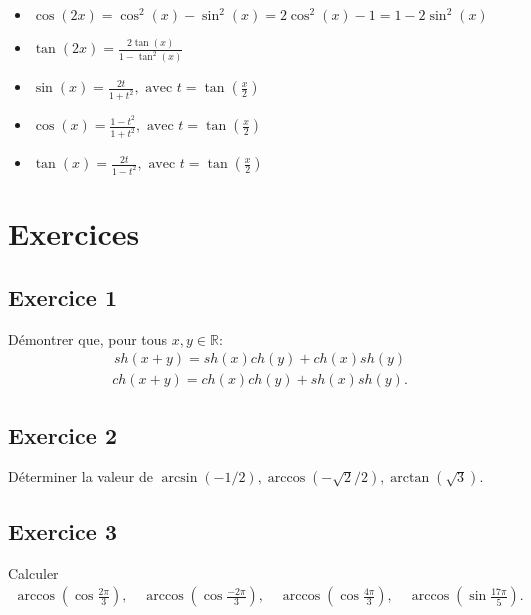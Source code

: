\documentclass[letterpaper,10pt,french]{jupyterBook}
\begin{document}
\begin{itemize}
\item {} 
\sphinxAtStartPar
\(\cos(2x) = \cos^2(x) - \sin^2(x) = 2\cos^2(x) -1 = 1 - 2\sin^2(x)\)

\item {} 
\sphinxAtStartPar
\(\tan(2x) = \frac{2\tan(x)}{1-\tan^2(x)}\)

\item {} 
\sphinxAtStartPar
\(\sin(x) = \frac{2t}{1+t^2}, \mbox{ avec } t=\tan(\frac{x}{2})\)

\item {} 
\sphinxAtStartPar
\(\cos(x) = \frac{1-t^2}{1+t^2} , \mbox{ avec } t=\tan(\frac{x}{2})\)

\item {} 
\sphinxAtStartPar
\(\tan(x) = \frac{2t}{1-t^2} , \mbox{ avec } t=\tan(\frac{x}{2})\)

\end{itemize}


\section{Exercices}
\label{\detokenize{exo5:exercices}}\label{\detokenize{exo5::doc}}

\subsection{Exercice 1}
\label{\detokenize{exo5:exercice-1}}
\sphinxAtStartPar
Démontrer que, pour tous \(x,y \in \mathbb{R}\):
\begin{equation*}
\begin{split}
sh(x+y)=sh(x)ch(y)+ch(x)sh(y)
\end{split}
\end{equation*}\begin{equation*}
\begin{split}
ch(x+y)=ch(x)ch(y)+sh(x)sh(y).
\end{split}
\end{equation*}

\subsection{Exercice 2}
\label{\detokenize{exo5:exercice-2}}
\sphinxAtStartPar
Déterminer la valeur de \( \arcsin(-1/2), \arccos(-\sqrt 2/2), \arctan(\sqrt 3)\).


\subsection{Exercice 3}
\label{\detokenize{exo5:exercice-3}}
\sphinxAtStartPar
Calculer
\begin{equation*}
\begin{split}
\arccos \left(\cos\frac{2\pi}3\right),\quad \arccos\left(\cos\frac{-2\pi}{3}\right),\quad\arccos\left(\cos\frac{4\pi}{3}\right),\quad \arccos\left(\sin\frac{17\pi}5\right).
\end{split}
\end{equation*}
\end{document}
